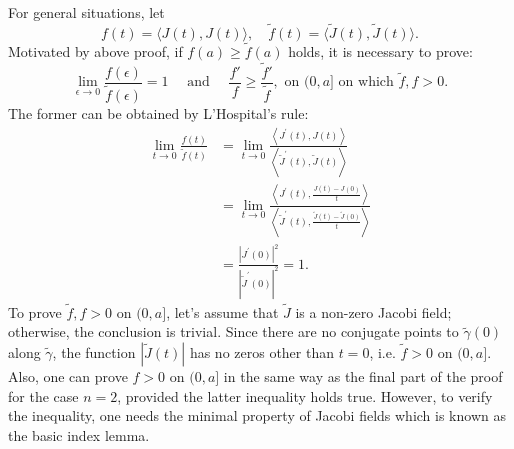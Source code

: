 \documentclass{ctexart}
\begin{document}
For general situations, let 
$$
f(t)=\langle J(t),J(t)\rangle,\quad \widetilde{f}(t)=\langle \widetilde{J}(t),\widetilde{J}(t)\rangle.
$$
Motivated by above proof, if $f(a) \geq \tilde{f}(a)$ holds, it is necessary to prove: 
$$
\lim_{\epsilon \rightarrow 0} \frac{f(\epsilon)}{\tilde{f}(\epsilon)} = 1 \quad \text{ and } \quad \frac{f' }{f} \geq \frac{\tilde{f}'}{\tilde{f}}, \text{ on } (0,a] \text{ on which } \tilde{f},f > 0.
$$
The former can be obtained by L'Hospital's rule:
$$
\begin{aligned}
\lim _{t \rightarrow 0} \frac{f(t)}{\tilde{f}(t)} 
& =\lim _{t \rightarrow 0} \frac{\left\langle J^{\prime}(t), J(t)\right\rangle}{\left\langle\tilde{J}^{\prime}(t), \tilde{J}(t)\right\rangle} \\
& =\lim _{t \rightarrow 0} \frac{\left\langle J^{\prime}(t), \frac{J(t)-J(0)}{t}\right\rangle}{\left\langle\tilde{J}^{\prime}(t), \frac{\tilde{J}(t)-\tilde{J}(0)}{t}\right\rangle} \\
& =\frac{\left|J^{\prime}(0)\right|^2}{\left|\tilde{J}^{\prime}(0)\right|^2}=1.
\end{aligned}
$$
To prove $\tilde{f},f > 0$ on $(0,a]$, let's assume that $\tilde{J}$ is a non-zero Jacobi field; otherwise, the conclusion is trivial. 
Since there are no conjugate points to $\tilde{\gamma}(0)$ along $\tilde{\gamma}$, the function $|\tilde{J}(t)|$ has no zeros other than $t=0$, 
i.e. $\tilde{f} > 0$ on $(0,a]$. Also, one can prove $f>0$ on $(0,a]$ in the same way as the final part of the proof for the case $n=2$, provided the latter inequality holds true. 
However, to verify the inequality, one needs the minimal property of Jacobi fields which is known as the basic index lemma.

\end{document}
